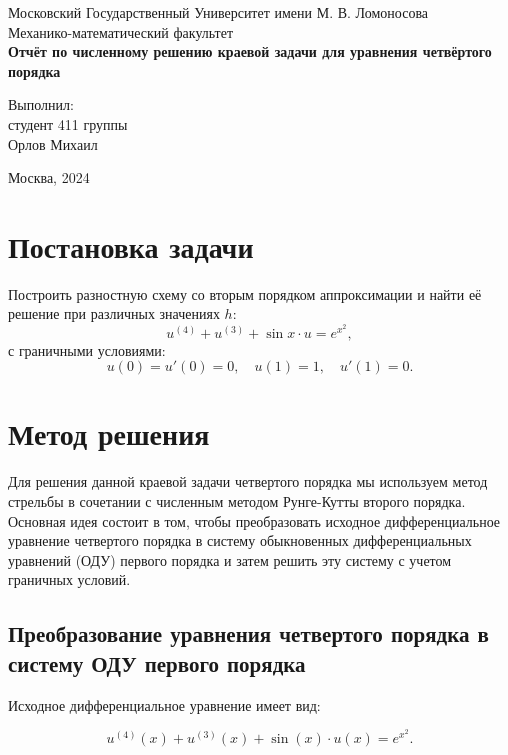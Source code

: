 \documentclass{article}
\begin{document}
\begin{titlepage}
    \centering
    {\large Московский Государственный Университет имени М. В. Ломоносова\\[0.5cm]
    Механико-математический факультет}\\[5cm]

    \textbf{\Large Отчёт по численному решению краевой задачи для уравнения четвёртого порядка}\\[2cm]
    
    \begin{flushright}
        Выполнил:\\
        студент 411 группы\\
        Орлов Михаил
    \end{flushright}

    \vfill
    Москва, 2024
\end{titlepage}
\newpage
\tableofcontents

\newpage
\section{Постановка задачи}

Построить разностную схему со вторым порядком аппроксимации и найти её решение при различных значениях $h$:
\[
u^{(4)} + u^{(3)} + \sin{x} \cdot u = e^{x^2},
\]
с граничными условиями:
\[
u(0) = u'(0) = 0, \quad u(1) = 1, \quad u'(1) = 0.
\]

\section{Метод решения}

Для решения данной краевой задачи четвертого порядка мы используем метод стрельбы в сочетании с численным методом Рунге-Кутты второго порядка. Основная идея состоит в том, чтобы преобразовать исходное дифференциальное уравнение четвертого порядка в систему обыкновенных дифференциальных уравнений (ОДУ) первого порядка и затем решить эту систему с учетом граничных условий.

\subsection{Преобразование уравнения четвертого порядка в систему ОДУ первого порядка}

Исходное дифференциальное уравнение имеет вид:

\begin{equation}
u^{(4)}(x) + u^{(3)}(x) + \sin(x) \cdot u(x) = e^{x^2}.
\end{equation}
\end{document}
